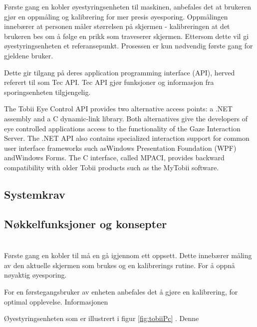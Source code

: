 \documentclass[phd,tocprelim]{cornell}
\begin{document}
Første gang en kobler øyestyringsenheten til maskinen, anbefales det at brukeren gjør en oppmåling og kalibrering for mer presis øyesporing. Oppmålingen innebærer at personen måler størrelsen på skjermen - kalibreringen at det brukeren bes om å følge en prikk som traveserer skjermen. Ettersom dette vil gi øyestyringsenheten et referansepunkt. Prosessen er kun nødvendig første gang for gjeldene bruker. 






Dette gir tilgang på deres application programming interface (API), herved referert til som Tec API. Tec API gjør funksjoner og informasjon fra sporingsenheten tilgjengelig. 


The Tobii Eye Control API provides two alternative access points: a .NET assembly and a C dynamic-link library. Both alternatives
give the developers of eye controlled applications access to the functionality of the Gaze Interaction Server. The .NET API also
contains specialized interaction support for common user interface frameworks such asWindows Presentation Foundation
(WPF) andWindows Forms. The C interface, called MPACI, provides backward compatibility with older Tobii products such as
the MyTobii software.



\subsection{Systemkrav}

\subsection{Nøkkelfunksjoner og konsepter}

\section{}

Første gang en kobler til må en gå igjennom ett oppsett. Dette innebærer måling av den aktuelle skjermen som brukes og en kalibrerings rutine. For å oppnå nøyaktig øyesporing.  

For en førstegangsbruker av enheten anbefales det å gjøre en kalibrering, for optimal opplevelse. Informasjonen


Øyestyringsenheten som er illustrert i figur \ref{fig:tobiiPc}  . Denne




\medskip


\end{document}
